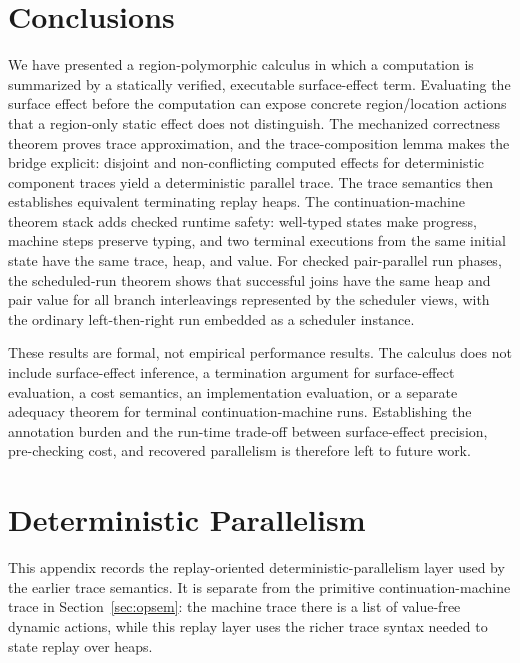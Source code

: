 \documentclass[10pt,a4paper]{article}
\begin{document}
\section{Conclusions}
\label{sec:conclusions}

We have presented a region-polymorphic calculus in which a computation is
summarized by a statically verified, executable surface-effect term. Evaluating
the surface effect before the computation can expose concrete region/location actions
that a region-only static effect does not distinguish. The mechanized
correctness theorem proves trace approximation, and the trace-composition
lemma makes the bridge explicit: disjoint and non-conflicting computed
effects for deterministic component traces yield a deterministic parallel
trace. The trace semantics then establishes equivalent terminating replay
heaps. The continuation-machine theorem stack adds checked runtime safety:
well-typed states make progress, machine steps preserve typing, and two
terminal executions from the same initial state have the same trace, heap, and
value. For checked pair-parallel run phases, the scheduled-run theorem shows
that successful joins have the same heap and pair value for all branch
interleavings represented by the scheduler views, with the ordinary
left-then-right run embedded as a scheduler instance.

These results are formal, not empirical performance results. The calculus does
not include surface-effect inference, a termination argument for surface-effect evaluation, a
cost semantics, an implementation evaluation, or a separate adequacy theorem for
terminal continuation-machine runs.
Establishing the annotation burden and the run-time trade-off between surface-effect
precision, pre-checking cost, and recovered parallelism is therefore left to
future work.




\appendix

\section{Deterministic Parallelism}
\label{app:determinism}

This appendix records the replay-oriented deterministic-parallelism layer used
by the earlier trace semantics. It is separate from the primitive
continuation-machine trace in Section~\ref{sec:opsem}: the machine
trace there is a list of value-free dynamic actions, while this replay layer uses
the richer trace syntax needed to state replay over heaps.
\end{document}
